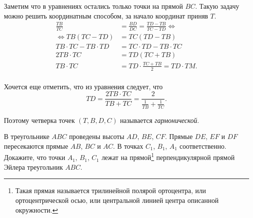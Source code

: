\begin{tasks}
{                        Заметим что в уравнениях  остались только точки на прямой $BC$. Такую задачу можно решить координатным способом, за начало координат приняв $T$. 
                        \begin{equation}\label{eq:42.4}
                            \begin{aligned}
                                \frac{TB}{TC} &= \frac{BD}{DC} = \frac{TD-TB}{TC-TD} \Longleftrightarrow \\ 
                                \Longleftrightarrow TB(TC-TD) &= TC(TD-TB) \\
                                TB\cdot TC - TB \cdot TD &= TC \cdot TD - TB\cdot TC \\
                                2 TB\cdot TC &= TD \left( TC + TB \right) \\
                                TB \cdot TC &= TD \cdot \frac{TC+TB}{2} = TD \cdot TM. \\
                            \end{aligned} 
                        \end{equation} 

                        Хочется еще отметить, что из уравнения  следует, что 
                        \[
                            TD = \frac{2TB\cdot TC}{TB + TC} = \frac{2}{\frac{1}{TB}+\frac{1}{TC}}
                        .\] 

                        Поэтому четверка точек  $\left( T, B, D, C \right) $ называется \emph{гармонической}.
                    }

                    \moditem{*} В треугольнике $ABC$ проведены высоты $AD$, $BE$, $CF$. Прямые $DE$, $EF$ и $DF$ пересекаются прямые $AB$, $BC$ и $AC$. В точках $C_1$, $B_1$, $A_1$ соответственно. Докажите, что точки $A_1$, $B_1$, $C_1$ лежат на прямой\footnote{Такая прямая называется трилинейной полярой ортоцентра, или ортоцентрической осью, или центральной линией центра описанной окружности.} перпендикулярной прямой Эйлера треугольник $ABC$.


\end{tasks}
